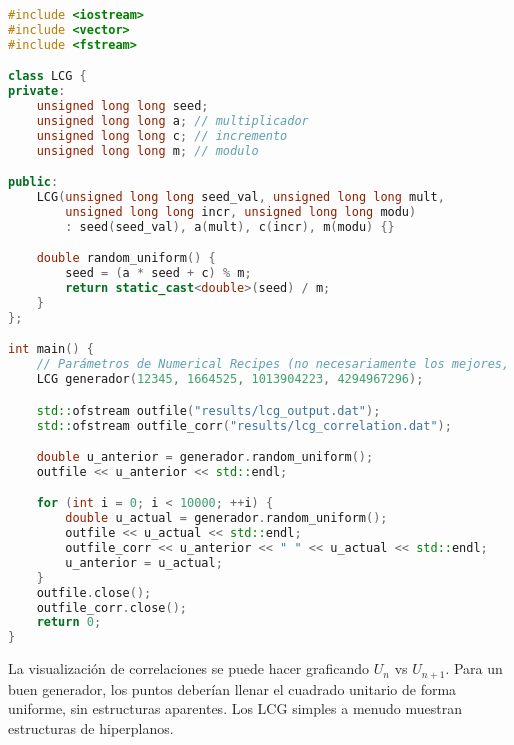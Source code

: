 \documentclass[11pt,a4paper]{article}
\begin{document}
\begin{lstlisting}[language=C++, caption=Ejemplo de LCG simple, basicstyle=\footnotesize\ttfamily]
#include <iostream>
#include <vector>
#include <fstream>

class LCG {
private:
    unsigned long long seed;
    unsigned long long a; // multiplicador
    unsigned long long c; // incremento
    unsigned long long m; // modulo

public:
    LCG(unsigned long long seed_val, unsigned long long mult,
        unsigned long long incr, unsigned long long modu)
        : seed(seed_val), a(mult), c(incr), m(modu) {}

    double random_uniform() {
        seed = (a * seed + c) % m;
        return static_cast<double>(seed) / m;
    }
};

int main() {
    // Parámetros de Numerical Recipes (no necesariamente los mejores, solo ejemplo)
    LCG generador(12345, 1664525, 1013904223, 4294967296);

    std::ofstream outfile("results/lcg_output.dat");
    std::ofstream outfile_corr("results/lcg_correlation.dat");

    double u_anterior = generador.random_uniform();
    outfile << u_anterior << std::endl;

    for (int i = 0; i < 10000; ++i) {
        double u_actual = generador.random_uniform();
        outfile << u_actual << std::endl;
        outfile_corr << u_anterior << " " << u_actual << std::endl;
        u_anterior = u_actual;
    }
    outfile.close();
    outfile_corr.close();
    return 0;
}
\end{lstlisting}
La visualización de correlaciones se puede hacer graficando $U_n$ vs $U_{n+1}$. Para un buen generador, los puntos deberían llenar el cuadrado unitario de forma uniforme, sin estructuras aparentes. Los LCG simples a menudo muestran estructuras de hiperplanos.
\end{document}
